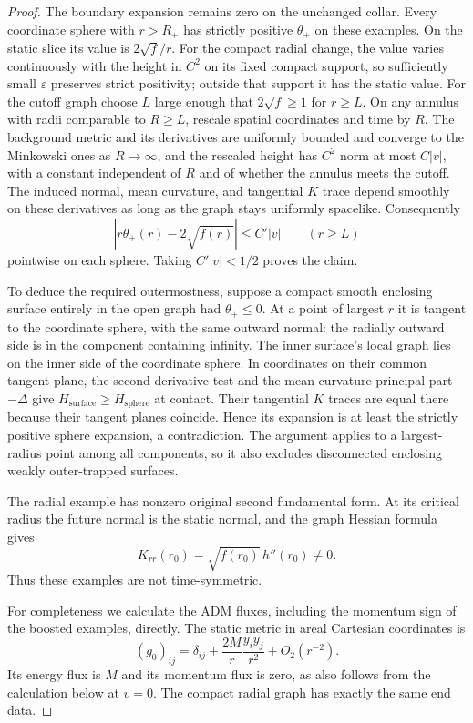 \begin{proof}
The boundary expansion remains zero on the unchanged collar.
Every coordinate sphere with $r>R_+$ has strictly positive
$\theta_+$ on these examples.  On the static slice its value
is $2\sqrt f/r$.  For the compact radial change, the value
varies continuously with the height in $C^2$ on its fixed
compact support, so sufficiently small $\varepsilon$ preserves
strict positivity; outside that support it has the static
value.  For the cutoff graph choose $L$ large enough that
$2\sqrt f\geq1$ for $r\geq L$.  On any annulus with radii
comparable to $R\geq L$, rescale spatial coordinates and time
by $R$.  The background metric and its derivatives are
uniformly bounded and converge to the Minkowski ones as
$R\to\infty$, and the rescaled height has $C^2$ norm at most
$C|v|$, with a constant independent of $R$ and of whether the
annulus meets the cutoff.  The induced normal, mean curvature,
and tangential $K$ trace depend smoothly on these derivatives
as long as the graph stays uniformly spacelike.  Consequently
\[
 \left|r\theta_+(r)-2\sqrt{f(r)}\right|\leq C'|v|
 \qquad(r\geq L)
\]
pointwise on each sphere.  Taking $C'|v|<1/2$ proves the claim.

To deduce the required outermostness, suppose a compact smooth
enclosing surface entirely in the open graph had
$\theta_+\leq0$.  At a point of largest $r$ it is tangent to
the coordinate sphere, with the same outward normal: the
radially outward side is in the component containing infinity.
The inner surface's local graph lies on the inner side of the
coordinate sphere.  In coordinates on their common tangent
plane, the second derivative test and the mean-curvature
principal part $-\Delta$ give
$H_{\mathrm{surface}}\geq H_{\mathrm{sphere}}$ at contact.
Their tangential $K$ traces are equal there because their
tangent planes coincide.  Hence its expansion is at least
the strictly positive sphere expansion, a contradiction.
The argument applies to a largest-radius point among all
components, so it also excludes disconnected enclosing weakly
outer-trapped surfaces.

The radial example has nonzero original second fundamental
form.  At its critical radius the future normal is the static
normal, and the graph Hessian formula gives
\[
 K_{rr}(r_0)=\sqrt{f(r_0)}\,h''(r_0)\ne0.
\]
Thus these examples are not time-symmetric.

For completeness we calculate the ADM fluxes, including the
momentum sign of the boosted examples, directly.  The static
metric in areal Cartesian coordinates is
\[
 (g_0)_{ij}=\delta_{ij}+\frac{2M}{r}\frac{y_i y_j}{r^2}
                   +O_2(r^{-2}).
\]
Its energy flux is $M$ and its momentum flux is zero, as also
follows from the calculation below at $v=0$.  The compact
radial graph has exactly the same end data.


\end{proof}
